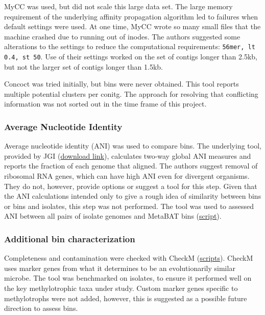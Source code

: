 MyCC was used, but did not scale this large data set.
The large memory requirement of the underlying affinity propagation algorithm led to failures when default settings were used.
At one time, MyCC wrote so many small files that the machine crashed due to running out of inodes.
The authors suggested some alterations to the settings to reduce the computational requirements:  \texttt{56mer, lt 0.4, st 50}.
Use of their settings worked on the set of contigs longer than 2.5kb, but not the larger set of contigs longer than 1.5kb.

Concoct was tried initially, but bins were never obtained.
This tool reports multiple potential clusters per conitg.
The approach for resolving that conflicting information was not sorted out in the time frame of this project.

\subsubsection{Average Nucleotide Identity}
Average nucleotide identity (ANI) was used to compare bins.
The underlying tool, provided by JGI  \cite{varghese2015} (\href{https://ani.jgi-psf.org/html/anicalculator.php}{download link}), calculates two-way global ANI measures and reports the fraction of each genome that aligned.
The authors suggest removal of ribosomal RNA genes, which can have high ANI even for divergent organisms.
They do not, however, provide options or suggest a tool for this step.
Given that the ANI calculations intended only to give a rough idea of similarity between bins or bins and isolates, this step was not performed.
The tool was used to assessed ANI between all pairs of isolate genomes and MetaBAT bins (\href{https://github.com/BeckResearchLab/meta4/blob/master/m4b_binning/assembly/ANI/ANIs_of_all_combos.py}{script}).

\subsubsection{Additional bin characterization}

Completeness and contamination were checked with CheckM \cite{parks2015} (\href{https://github.com/BeckResearchLab/meta4/tree/master/m4b_binning/assembly/bin_info}{scripts}).
CheckM uses marker genes from what it determines to be an evolutionarily similar microbe.
The tool was benchmarked on isolates, to ensure it performed well on the key methylotrophic taxa under study.
Custom marker genes specific to methylotrophs were not added, however, this is suggested as a possible future direction to assess bins.

